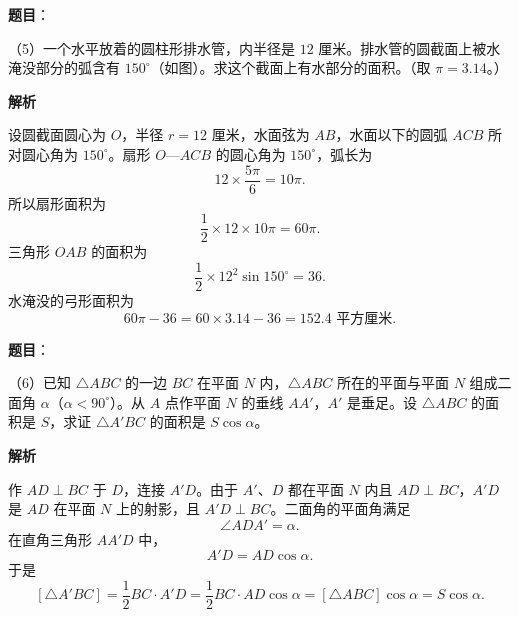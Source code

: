 \begin{answer}

\textbf{题目}：

（5）一个水平放着的圆柱形排水管，内半径是 $12$ 厘米。排水管的圆截面上被水淹没部分的弧含有 $150^\circ$（如图）。求这个截面上有水部分的面积。（取 $\pi=3.14$。）
\nopagebreak[4]
\begin{center}\end{center}
\nopagebreak[4]
\textbf{解析}

设圆截面圆心为 $O$，半径 $r=12$ 厘米，水面弦为 $AB$，水面以下的圆弧 $ACB$ 所对圆心角为 $150^\circ$。扇形 $O$—$ACB$ 的圆心角为 $150^\circ$，弧长为
\[
12\times\frac{5\pi}{6}=10\pi.
\]
所以扇形面积为
\[
\frac12\times12\times10\pi=60\pi.
\]
三角形 $OAB$ 的面积为
\[
\frac12\times12^2\sin150^\circ=36.
\]
水淹没的弓形面积为
\[
60\pi-36=60\times3.14-36=152.4\text{ 平方厘米}.
\]


\end{answer}
\begin{answer}

\textbf{题目}：

（6）已知 $\triangle ABC$ 的一边 $BC$ 在平面 $N$ 内，$\triangle ABC$ 所在的平面与平面 $N$ 组成二面角 $\alpha$（$\alpha<90^\circ$）。从 $A$ 点作平面 $N$ 的垂线 $AA'$，$A'$ 是垂足。设 $\triangle ABC$ 的面积是 $S$，求证 $\triangle A'BC$ 的面积是 $S\cos\alpha$。

\textbf{解析}
\nopagebreak[4]
\begin{center}\end{center}
\nopagebreak[4]
作 $AD\perp BC$ 于 $D$，连接 $A'D$。由于 $A'$、$D$ 都在平面 $N$ 内且 $AD\perp BC$，$A'D$ 是 $AD$ 在平面 $N$ 上的射影，且 $A'D\perp BC$。二面角的平面角满足
\[
\angle ADA'=\alpha.
\]
在直角三角形 $AA'D$ 中，
\[
A'D=AD\cos\alpha.
\]
于是
\[
[\triangle A'BC]=\frac12BC\cdot A'D
=\frac12BC\cdot AD\cos\alpha
=[\triangle ABC]\cos\alpha
=S\cos\alpha.
\]


\end{answer}


